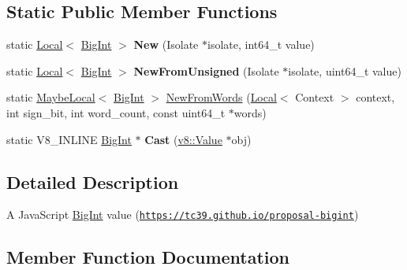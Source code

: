 \subsection*{Static Public Member Functions}
\begin{DoxyCompactItemize}
\item 
\mbox{\label{classv8_1_1BigInt_a2ae15b635778d6c84f7715c8fb75aab6}} 
static \mbox{\hyperlink{classv8_1_1Local}{Local}}$<$ \mbox{\hyperlink{classv8_1_1BigInt}{Big\+Int}} $>$ {\bfseries New} (Isolate $\ast$isolate, int64\+\_\+t value)
\item 
\mbox{\label{classv8_1_1BigInt_afae6436f0bce457d6280a25377dca250}} 
static \mbox{\hyperlink{classv8_1_1Local}{Local}}$<$ \mbox{\hyperlink{classv8_1_1BigInt}{Big\+Int}} $>$ {\bfseries New\+From\+Unsigned} (Isolate $\ast$isolate, uint64\+\_\+t value)
\item 
static \mbox{\hyperlink{classv8_1_1MaybeLocal}{Maybe\+Local}}$<$ \mbox{\hyperlink{classv8_1_1BigInt}{Big\+Int}} $>$ \mbox{\hyperlink{classv8_1_1BigInt_a2e315509efbc08fef90ef54d7e179e4d}{New\+From\+Words}} (\mbox{\hyperlink{classv8_1_1Local}{Local}}$<$ Context $>$ context, int sign\+\_\+bit, int word\+\_\+count, const uint64\+\_\+t $\ast$words)
\item 
\mbox{\label{classv8_1_1BigInt_ad6d5b03552c5f81589d641ef2fc055d8}} 
static V8\+\_\+\+I\+N\+L\+I\+NE \mbox{\hyperlink{classv8_1_1BigInt}{Big\+Int}} $\ast$ {\bfseries Cast} (\mbox{\hyperlink{classv8_1_1Value}{v8\+::\+Value}} $\ast$obj)
\end{DoxyCompactItemize}


\subsection{Detailed Description}
A Java\+Script \mbox{\hyperlink{classv8_1_1BigInt}{Big\+Int}} value (\href{https://tc39.github.io/proposal-bigint}{\tt https\+://tc39.\+github.\+io/proposal-\/bigint}) 

\subsection{Member Function Documentation}
\mbox{\label{classv8_1_1BigInt_a6478543bf9a595571d76e60fd3f2af0e}} 
